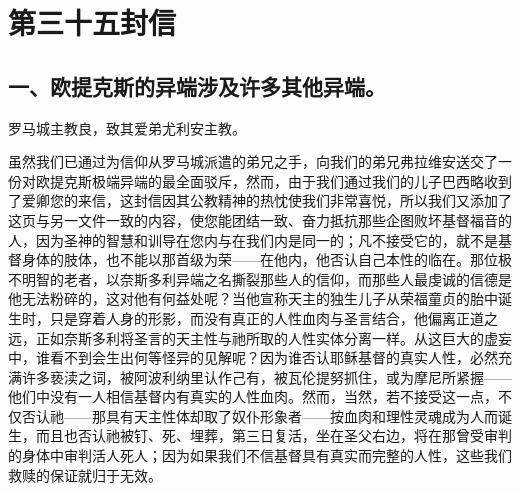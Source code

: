 

\section{第三十五封信}

\par


\subsection{一、欧提克斯的异端涉及许多其他异端。}

罗马城主教良，致其爱弟尤利安主教。\par

虽然我们已通过为信仰从罗马城派遣的弟兄之手，向我们的弟兄弗拉维安送交了一份对欧提克斯极端异端的最全面驳斥，然而，由于我们通过我们的儿子巴西略收到了爱卿您的来信，这封信因其公教精神的热忱使我们非常喜悦，所以我们又添加了这页与另一文件一致的内容，使您能团结一致、奋力抵抗那些企图败坏基督福音的人，因为圣神的智慧和训导在您内与在我们内是同一的；凡不接受它的，就不是基督身体的肢体，也不能以那首级为荣——在他内，他否认自己本性的临在。那位极不明智的老者，以奈斯多利异端之名撕裂那些人的信仰，而那些人最虔诚的信德是他无法粉碎的，这对他有何益处呢？当他宣称天主的独生儿子从荣福童贞的胎中诞生时，只是穿着人身的形影，而没有真正的人性血肉与圣言结合，他偏离正道之远，正如奈斯多利将圣言的天主性与祂所取的人性实体分离一样。从这巨大的虚妄中，谁看不到会生出何等怪异的见解呢？因为谁否认耶稣基督的真实人性，必然充满许多亵渎之词，被阿波利纳里认作己有，被瓦伦提努抓住，或为摩尼所紧握——他们中没有一人相信基督内有真实的人性血肉。然而，当然，若不接受这一点，不仅否认祂——那具有天主性体却取了奴仆形象者——按血肉和理性灵魂成为人而诞生，而且也否认祂被钉、死、埋葬，第三日复活，坐在圣父右边，将在那曾受审判的身体中审判活人死人；因为如果我们不信基督具有真实而完整的人性，这些我们救赎的保证就归于无效。\par


